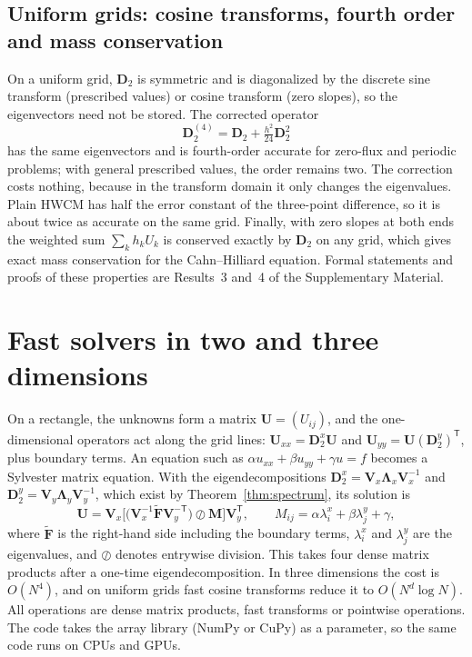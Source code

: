 \documentclass[preprint,12pt]{elsarticle}
\theoremstyle{remark}
\begin{document}
\subsection{Uniform grids: cosine transforms, fourth order and mass conservation}
On a uniform grid, $\mathbf D_2$ is symmetric and is diagonalized by the discrete sine transform (prescribed
values) or cosine transform (zero slopes), so the eigenvectors need not be stored. The corrected operator
\begin{equation}\label{eq:D24}
\mathbf D_2^{(4)}=\mathbf D_2+\tfrac{h^2}{24}\mathbf D_2^2
\end{equation}
has the same eigenvectors and is fourth-order accurate for zero-flux and periodic problems; with general
prescribed values, the order remains two. The correction costs nothing, because in the transform domain it
only changes the eigenvalues. Plain HWCM has half the error constant of the three-point difference, so it
is about twice as accurate on the same grid. Finally, with zero slopes at both ends the weighted sum
$\sum_kh_kU_k$ is conserved exactly by $\mathbf D_2$ on any grid, which gives exact mass conservation for the
Cahn--Hilliard equation. Formal statements and proofs of these properties are Results~3 and~4 of the
Supplementary Material.

\section{Fast solvers in two and three dimensions}\label{sec:tensor}
On a rectangle, the unknowns form a matrix $\mathbf U=(U_{ij})$, and the one-dimensional operators act along
the grid lines: $\mathbf U_{xx}=\mathbf D_2^x\mathbf U$ and $\mathbf U_{yy}=\mathbf U(\mathbf D_2^y)^{\mathsf T}$, plus boundary terms. An equation such as
$\alpha u_{xx}+\beta u_{yy}+\gamma u=f$ becomes a Sylvester matrix equation. With the eigendecompositions
$\mathbf D_2^x=\mathbf V_x\boldsymbol\Lambda_x\mathbf V_x^{-1}$ and $\mathbf D_2^y=\mathbf V_y\boldsymbol\Lambda_y\mathbf V_y^{-1}$, which exist by Theorem~\ref{thm:spectrum},
its solution is
\begin{equation}\label{eq:fdm}
\mathbf U=\mathbf V_x\Big[\big(\mathbf V_x^{-1}\tilde{\mathbf F}\mathbf V_y^{-\mathsf T}\big)\oslash\mathbf M\Big]\mathbf V_y^{\mathsf T},
\qquad M_{ij}=\alpha\lambda^x_i+\beta\lambda^y_j+\gamma,
\end{equation}
where $\tilde{\mathbf F}$ is the right-hand side including the boundary terms, $\lambda^x_i$ and $\lambda^y_j$
are the eigenvalues, and $\oslash$ denotes entrywise division. This takes four dense matrix products after a one-time
eigendecomposition. In three dimensions the cost is $O(N^4)$, and on uniform grids fast cosine
transforms reduce it to $O(N^d\log N)$. All operations are dense matrix products, fast transforms or
pointwise operations. The code takes the array library (NumPy or CuPy) as a parameter, so the same code
runs on CPUs and GPUs.
\end{document}
